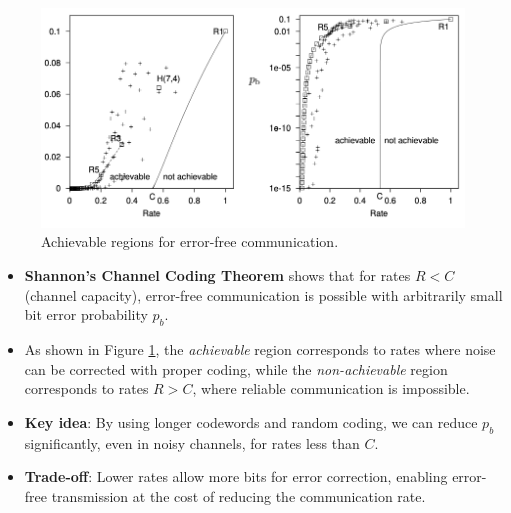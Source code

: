 \begin{figure}[h]
    \includegraphics[width=\linewidth]{img/shannon-error-free.png}
    \caption{Achievable regions for error-free communication.}
    \label{fig:shannon-error-free}
\end{figure}

\begin{itemize}
    \item \textbf{Shannon's Channel Coding Theorem} shows that for rates \(R < C\) (channel capacity), error-free communication is possible with arbitrarily small bit error probability \(p_b\).
    \item As shown in Figure \ref{fig:shannon-error-free}, the \textit{achievable} region corresponds to rates where noise can be corrected with proper coding, while the \textit{non-achievable} region corresponds to rates \(R > C\), where reliable communication is impossible.
    \item \textbf{Key idea}: By using longer codewords and random coding, we can reduce \(p_b\) significantly, even in noisy channels, for rates less than \(C\).
    \item \textbf{Trade-off}: Lower rates allow more bits for error correction, enabling error-free transmission at the cost of reducing the communication rate.
\end{itemize}



